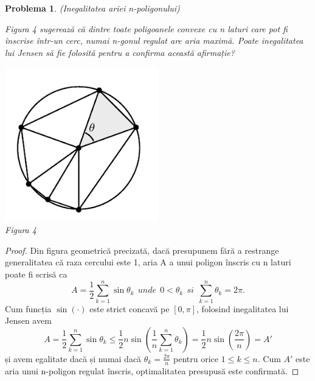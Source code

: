 \documentclass[a4paper,12pt,oneside]{report}
\newtheorem{problem}{Problema}
\begin{document}
\begin{problem} (Inegalitatea ariei n-poligonului)

Figura 4 sugerează că  dintre toate poligoanele convexe cu n laturi care pot fi înscrise într-un cerc, numai n-gonul regulat are aria maximă. Poate inegalitatea lui Jensen să fie folosită pentru a confirma această afirmație?

\begin{center}
	\includegraphics[width=0.5\textwidth]{fig_pb6.png}
	\\ Figura 4
\end{center}
\end{problem}
\begin{proof}
Din figura geometrică precizată, dacă presupunem fără a restrange generalitatea că raza cercului este 1, aria A a unui poligon înscris cu n laturi poate fi scrisă ca
\begin{displaymath}
  A = \frac{1}{2}\sum_{k = 1}^{n} \sin \theta _{k} ~~unde ~~0< \theta _{k} ~~si~~ \sum_{k = 1}^n{\theta _{k}} = 2\pi.
\end{displaymath}
	Cum funcția  \(\sin \left ( \cdot  \right )\) este strict concavă pe \(\left [ 0 , \pi  \right ]\), folosind inegalitatea lui Jensen avem
\begin{displaymath}
  A = \frac{1}{2}\sum_{k = 1}^{n} \sin \theta _{k}  \leq \frac{1}{2}n\sin\left ( \frac{1}{n}\sum_{k = 1}^{n}\theta _{k} \right ) = \frac{1}{2}n\sin \left ( \frac{2\pi }{n} \right ) = {A}'
\end{displaymath}
și avem egalitate dacă și numai dacă \(\theta _{k} = \frac{2\pi }{n}\) pentru orice \(1\leq k\leq n\). Cum \({A}'\) este aria unui n-poligon regulat înscris, optimalitatea presupusă este confirmată.
\end{proof}
\end{document}
